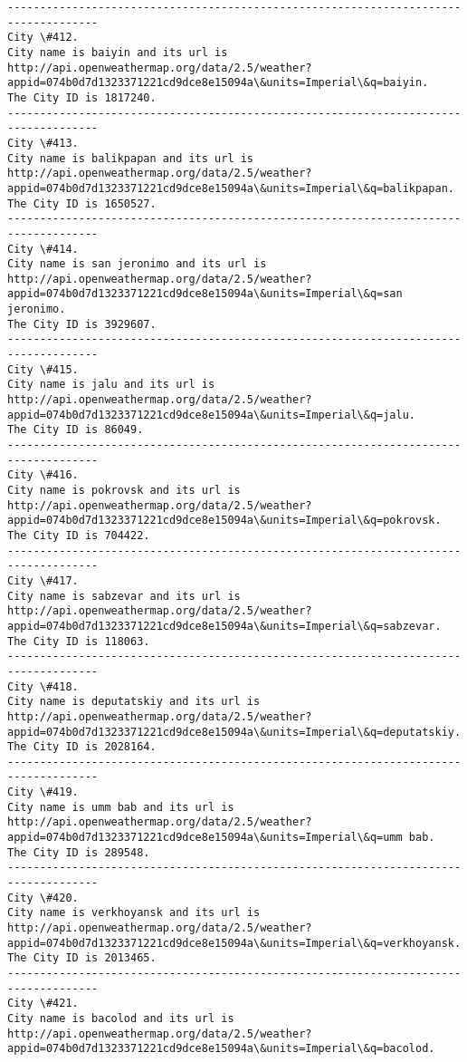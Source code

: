 \documentclass[11pt]{article}
\begin{document}
\begin{Verbatim}[commandchars=\\\{\}]
------------------------------------------------------------------------------------
City \#412.
City name is baiyin and its url is http://api.openweathermap.org/data/2.5/weather?appid=074b0d7d1323371221cd9dce8e15094a\&units=Imperial\&q=baiyin.
The City ID is 1817240.
------------------------------------------------------------------------------------
City \#413.
City name is balikpapan and its url is http://api.openweathermap.org/data/2.5/weather?appid=074b0d7d1323371221cd9dce8e15094a\&units=Imperial\&q=balikpapan.
The City ID is 1650527.
------------------------------------------------------------------------------------
City \#414.
City name is san jeronimo and its url is http://api.openweathermap.org/data/2.5/weather?appid=074b0d7d1323371221cd9dce8e15094a\&units=Imperial\&q=san jeronimo.
The City ID is 3929607.
------------------------------------------------------------------------------------
City \#415.
City name is jalu and its url is http://api.openweathermap.org/data/2.5/weather?appid=074b0d7d1323371221cd9dce8e15094a\&units=Imperial\&q=jalu.
The City ID is 86049.
------------------------------------------------------------------------------------
City \#416.
City name is pokrovsk and its url is http://api.openweathermap.org/data/2.5/weather?appid=074b0d7d1323371221cd9dce8e15094a\&units=Imperial\&q=pokrovsk.
The City ID is 704422.
------------------------------------------------------------------------------------
City \#417.
City name is sabzevar and its url is http://api.openweathermap.org/data/2.5/weather?appid=074b0d7d1323371221cd9dce8e15094a\&units=Imperial\&q=sabzevar.
The City ID is 118063.
------------------------------------------------------------------------------------
City \#418.
City name is deputatskiy and its url is http://api.openweathermap.org/data/2.5/weather?appid=074b0d7d1323371221cd9dce8e15094a\&units=Imperial\&q=deputatskiy.
The City ID is 2028164.
------------------------------------------------------------------------------------
City \#419.
City name is umm bab and its url is http://api.openweathermap.org/data/2.5/weather?appid=074b0d7d1323371221cd9dce8e15094a\&units=Imperial\&q=umm bab.
The City ID is 289548.
------------------------------------------------------------------------------------
City \#420.
City name is verkhoyansk and its url is http://api.openweathermap.org/data/2.5/weather?appid=074b0d7d1323371221cd9dce8e15094a\&units=Imperial\&q=verkhoyansk.
The City ID is 2013465.
------------------------------------------------------------------------------------
City \#421.
City name is bacolod and its url is http://api.openweathermap.org/data/2.5/weather?appid=074b0d7d1323371221cd9dce8e15094a\&units=Imperial\&q=bacolod.

\end{Verbatim}
\end{document}
